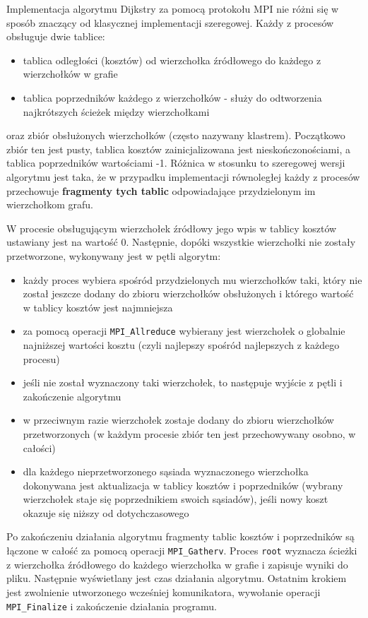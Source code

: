 \documentclass[12pt]{article}
\begin{document}
\vspace{5mm}
Implementacja algorytmu Dijkstry za pomocą protokołu MPI nie różni się w sposób znaczący od klasycznej implementacji szeregowej. Każdy z procesów obsługuje dwie tablice: 
\begin{itemize}
\item tablica odległości (kosztów) od wierzchołka źródłowego do każdego z wierzchołków w grafie
\item tablica poprzedników każdego z wierzchołków - służy do odtworzenia najkrótszych ścieżek między wierzchołkami
\end{itemize}
oraz zbiór obsłużonych wierzchołków (często nazywany klastrem). Początkowo zbiór ten jest pusty, tablica kosztów zainicjalizowana jest nieskończonościami, a tablica poprzedników wartościami -1. Różnica w stosunku to szeregowej wersji algorytmu jest taka, że w przypadku implementacji równoległej każdy z procesów przechowuje \textbf{fragmenty tych tablic} odpowiadające przydzielonym im wierzchołkom grafu.

\vspace{5mm}
W procesie obsługującym wierzchołek źródłowy jego wpis w tablicy kosztów ustawiany jest na wartość 0. Następnie, dopóki wszystkie wierzchołki nie zostały przetworzone, wykonywany jest w pętli algorytm:
\begin{itemize}
\item każdy proces wybiera spośród przydzielonych mu wierzchołków taki, który nie został jeszcze dodany do zbioru wierzchołków obsłużonych i którego wartość w tablicy kosztów jest najmniejsza
\item za pomocą operacji \lstinline{MPI_Allreduce} wybierany jest wierzchołek o globalnie najniższej wartości kosztu (czyli najlepszy spośród najlepszych z każdego procesu)
\item jeśli nie został wyznaczony taki wierzchołek, to następuje wyjście z pętli i zakończenie algorytmu
\item w przeciwnym razie wierzchołek zostaje dodany do zbioru wierzchołków przetworzonych (w każdym procesie zbiór ten jest przechowywany osobno, w całości)
\item dla każdego nieprzetworzonego sąsiada wyznaczonego wierzchołka dokonywana jest aktualizacja w tablicy kosztów i poprzedników (wybrany wierzchołek staje się poprzednikiem swoich sąsiadów), jeśli nowy koszt okazuje się niższy od dotychczasowego
\end{itemize}
Po zakończeniu działania algorytmu fragmenty tablic kosztów i poprzedników są łączone w całość za pomocą operacji \lstinline{MPI_Gatherv}. Proces \lstinline{root} wyznacza ścieżki z wierzchołka źródłowego do każdego wierzchołka w grafie i zapisuje wyniki do pliku. Następnie wyświetlany jest czas działania algorytmu. Ostatnim krokiem jest zwolnienie utworzonego wcześniej komunikatora, wywołanie operacji \lstinline{MPI_Finalize} i zakończenie działania programu.
\end{document}
